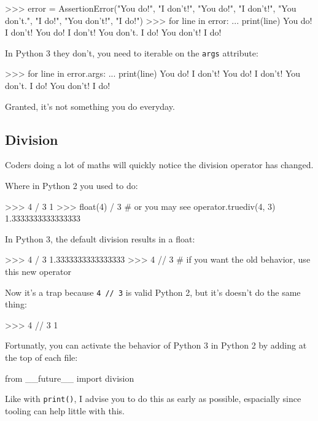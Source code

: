 \begin{py2}
>>> error = AssertionError("You do!", "I don't!", "You do!", "I don't!", "You don't.", "I do!",  "You don't!", "I do!")
>>> for line in error:
...     print(line)
You do!
I don't!
You do!
I don't!
You don't.
I do!
You don't!
I do!
\begin{py2}

In Python 3 they don't, you need to iterable on the \lstinline{args} attribute:

\begin{py2and3}
>>> for line in error.args:
...     print(line)
You do!
I don't!
You do!
I don't!
You don't.
I do!
You don't!
I do!
\begin{py2and3}

Granted, it's not something you do everyday.

\subsection{Division}

Coders doing a lot of maths will quickly notice the division operator has changed.

Where in Python 2 you used to do:

\begin{py2}
>>> 4 / 3
1
>>> float(4) / 3  # or you may see operator.truediv(4, 3)
1.3333333333333333
\end{py2}

In Python 3, the default division results in a float:

\begin{py3}
>>> 4 / 3
1.3333333333333333
>>> 4 // 3  # if you want the old behavior, use this new operator
\end{py3}

Now it's a trap because \lstinline{4 // 3} is valid Python 2, but it's doesn't do the same thing:

\begin{py2}
>>> 4 // 3
1
\end{py2}

Fortunatly, you can activate the behavior of Python 3 in Python 2 by adding at the top of each file:

\begin{py2and3}
from __future__ import division
\end{py2and3}

Like with \lstinline{print()}, I advise you to do this as early as possible, espacially since tooling can help little with this.



\end{py2and3}
\end{py2and3}
\end{py2}
\end{py2}
